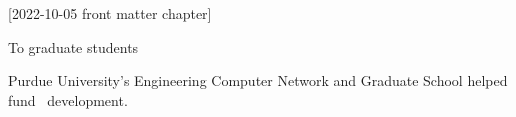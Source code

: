 [2022-10-05 front matter chapter]
%
%
%
%
%
%

%
%
%
\begin{statement}
\end{statement}

\begin{dedication}
  To graduate students
\end{dedication}

\begin{acknowledgments}
  Purdue University's Engineering Computer Network
  and Graduate School helped fund \PurdueThesisLogo\ development.
\end{acknowledgments}

\begin{preface}




\end{preface}

